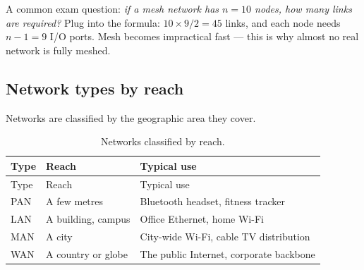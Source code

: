 \documentclass[
  letterpaper,
  DIV=11,
  numbers=noendperiod]{scrreprt}
\begin{document}
\begin{tcolorbox}[enhanced jigsaw, arc=.35mm, bottomrule=.15mm, bottomtitle=1mm, breakable, colback=white, colbacktitle=quarto-callout-tip-color!10!white, colframe=quarto-callout-tip-color-frame, coltitle=black, left=2mm, leftrule=.75mm, opacityback=0, opacitybacktitle=0.6, rightrule=.15mm, title=\textcolor{quarto-callout-tip-color}{\faLightbulb}\hspace{0.5em}{Counting links in a mesh}, titlerule=0mm, toprule=.15mm, toptitle=1mm]

A common exam question: \emph{if a mesh network has \(n=10\) nodes, how
many links are required?} Plug into the formula:
\(10 \times 9 / 2 = 45\) links, and each node needs \(n-1 = 9\) I/O
ports. Mesh becomes impractical fast --- this is why almost no real
network is fully meshed.

\end{tcolorbox}

\subsection{Network types by reach}\label{network-types-by-reach}

Networks are classified by the geographic area they cover.

\begin{longtable}[]{@{}
  >{\raggedright\arraybackslash}p{}
  >{\raggedright\arraybackslash}p{}
  >{\raggedright\arraybackslash}p{}@{}}
\caption{Networks classified by reach.}\label{tbl-reach}\tabularnewline
\toprule\noalign{}
\begin{minipage}[b]{\linewidth}\raggedright
Type
\end{minipage} & \begin{minipage}[b]{\linewidth}\raggedright
Reach
\end{minipage} & \begin{minipage}[b]{\linewidth}\raggedright
Typical use
\end{minipage} \\
\midrule\noalign{}
\endfirsthead
\toprule\noalign{}
\begin{minipage}[b]{\linewidth}\raggedright
Type
\end{minipage} & \begin{minipage}[b]{\linewidth}\raggedright
Reach
\end{minipage} & \begin{minipage}[b]{\linewidth}\raggedright
Typical use
\end{minipage} \\
\midrule\noalign{}
\endhead
\bottomrule\noalign{}
\endlastfoot
PAN & A few metres & Bluetooth headset, fitness tracker \\
LAN & A building, campus & Office Ethernet, home Wi-Fi \\
MAN & A city & City-wide Wi-Fi, cable TV distribution \\
WAN & A country or globe & The public Internet, corporate backbone \\
\end{longtable}
\end{document}
